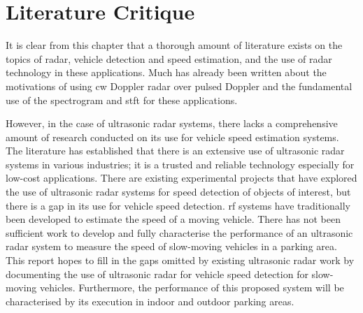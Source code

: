 \documentclass[class=report,11pt,crop=false]{standalone}
\begin{document}
\section{Literature Critique}
It is clear from this chapter that a thorough amount of literature exists on the topics of radar, vehicle detection and speed estimation, and the use of \gls{radar} technology in these applications. Much has already been written about the motivations of using \gls{cw} Doppler \gls{radar} over pulsed Doppler and the fundamental use of the spectrogram and \gls{stft} for these applications.

However, in the case of ultrasonic \gls{radar} systems, there lacks a comprehensive amount of research conducted on its use for vehicle speed estimation systems. The literature has established that there is an extensive use of ultrasonic \gls{radar} systems in various industries; it is a trusted and reliable technology especially for low-cost applications. There are existing experimental projects that have explored the use of ultrasonic radar systems for speed detection of objects of interest, but there is a gap in its use for vehicle speed detection. \Gls{rf} systems have traditionally been developed to estimate the speed of a moving vehicle. There has not been sufficient work to develop and fully characterise the performance of an ultrasonic radar system to measure the speed of slow-moving vehicles in a parking area. This report hopes to fill in the gaps omitted by existing ultrasonic \gls{radar} work by documenting the use of ultrasonic \gls{radar} for vehicle speed detection for slow-moving vehicles. Furthermore, the performance of this proposed system will be characterised by its execution in indoor and outdoor parking areas.

\ifstandalone

\printnoidxglossary[type=\acronymtype,nonumberlist]
\fi
\end{document}

